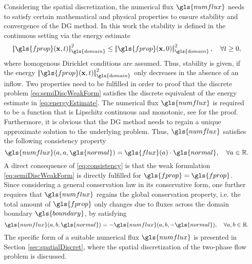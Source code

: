 Considering the spatial discretization, the numerical flux $\gls{numflux}$ needs to satisfy certain mathematical and physical properties to ensure stability and convergence of the DG method. In this work the stability is defined in the continuous setting via the energy estimate
\begin{equation}
	\norm{\gls{fprop}(\vectr{x},t)}_{\gls{domain}}^2 \leq \norm{\gls{fprop}(\vectr{x},0)}_{\gls{domain}}^2, \quad \forall t \geq 0,
	\label{eq:energyEstimate}
\end{equation}
where homogenous Dirichlet conditions are assumed. Thus, stability is given, if the energy  $\norm{\gls{fprop}(\vectr{x},t)}_{\gls{domain}}^2$ only decreases in the absence of an inflow.
Two properties need to be fulfilled in order to proof that the discrete problem \eqref{eq:semiDiscWeakForm} satisfies the discrete equivalent of the energy estimate in \eqref{eq:energyEstimate}. The numerical flux $\gls{numflux}$ is required to be a function that is Lipschitz continuous and monotonic, see \textcite{di_pietro_mathematical_2012} for the proof. Furthermore, it is obvious that the DG method needs to regain a unique approximate solution to the underlying problem. Thus, $\gls{numflux}$ satisfies the following consistency property
\begin{equation}
	\gls{numflux}(a,a,\gls{normal}) = \gls{flux}(a) \cdot \gls{normal}, \quad \forall a \in \mathbb{R}.
	\label{eq:consistency}
\end{equation}
A direct consequence of \eqref{eq:consistency} is that the weak formulation \eqref{eq:semiDiscWeakForm} is directly fulfilled for $\gls{fprop} = \gls{fprop}$. Since considering a general conservation law in its conservative form, one further requires that $\gls{numflux}$ regains the global conservation property, i.e. the total amount of $\gls{fprop}$ only changes due to fluxes across the domain boundary $\gls{boundary}$, by satisfying
\begin{equation}
	\gls{numflux}(a,b,\gls{normal}) = -\gls{numflux}(a,b,-\gls{normal}), \quad \forall a,b \in \mathbb{R}.
	\label{eq:conservativity}
\end{equation}
The specific form of a suitable numerical flux $\gls{numflux}$ is presented in Section \ref{sec:spatialDiscret}, where the spatial discretization of the two-phase flow problem is discussed.


